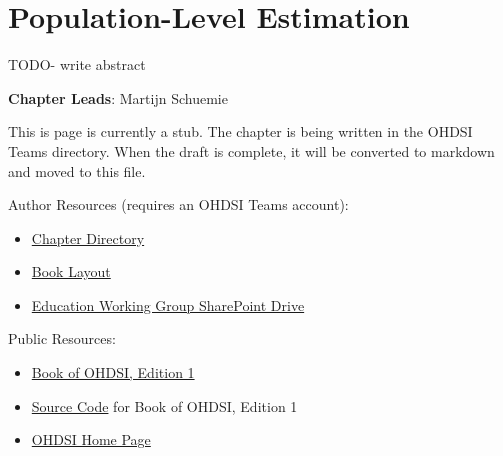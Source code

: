 \documentclass[
  letterpaper,
  paper=7in:10in,
  pagesize=pdftex,
  headinclude=on,
  footinclude=on,
  12pt]{scrbook}
\providecommand{\tightlist}{%
  \setlength{\itemsep}{0pt}\setlength{\parskip}{0pt}}\usepackage{longtable,booktabs,array}
\begin{document}
\chapter{Population-Level Estimation}\label{sec-analytics-population}

TODO- write abstract

\hfill\break

\textbf{Chapter Leads}: Martijn Schuemie

\begin{tcolorbox}[enhanced jigsaw, opacitybacktitle=0.6, coltitle=black, colback=white, bottomrule=.15mm, bottomtitle=1mm, title=\textcolor{quarto-callout-note-color}{\faInfo}\hspace{0.5em}{Note}, titlerule=0mm, rightrule=.15mm, colbacktitle=quarto-callout-note-color!10!white, colframe=quarto-callout-note-color-frame, toptitle=1mm, arc=.35mm, left=2mm, breakable, opacityback=0, leftrule=.75mm, toprule=.15mm]

This is page is currently a stub. The chapter is being written in the
OHDSI Teams directory. When the draft is complete, it will be converted
to markdown and moved to this file.

Author Resources (requires an OHDSI Teams account):

\begin{itemize}
\tightlist
\item
  \href{https://ohdsiorg.sharepoint.com/sites/Workgroup-EducationWorkingGroup/Shared\%20Documents/Forms/AllItems.aspx?id=\%2Fsites\%2FWorkgroup\%2DEducationWorkingGroup\%2FShared\%20Documents\%2FSection\%20III\%20\%2D\%20Analytics\%2FChapter\%2013\%20PLE&viewid=05fec2cc\%2Dec8a\%2D4d04\%2Db565\%2Dcf1289b96f67}{Chapter
  Directory}
\item
  \href{https://ohdsiorg.sharepoint.com/:x:/r/sites/Workgroup-EducationWorkingGroup/_layouts/15/Doc2.aspx?action=edit&sourcedoc=\%7B1fa31e39-1c5f-4918-b878-609ebd9810b3\%7D&wdOrigin=TEAMS-WEB.teamsSdk_ns.rwc&wdExp=TEAMS-TREATMENT&wdhostclicktime=1748104477731&web=1}{Book
  Layout}
\item
  \href{https://ohdsiorg.sharepoint.com/sites/Workgroup-EducationWorkingGroup/Shared\%20Documents/Forms/AllItems.aspx?viewid=05fec2cc\%2Dec8a\%2D4d04\%2Db565\%2Dcf1289b96f67}{Education
  Working Group SharePoint Drive}
\end{itemize}

Public Resources:

\begin{itemize}
\tightlist
\item
  \href{https://ohdsi.github.io/TheBookOfOhdsi/}{Book of OHDSI, Edition
  1}
\item
  \href{https://github.com/OHDSI/TheBookOfOhdsi}{Source Code} for Book
  of OHDSI, Edition 1
\item
  \href{https://ohdsi.org/}{OHDSI Home Page}
\end{itemize}

\end{tcolorbox}
\end{document}
